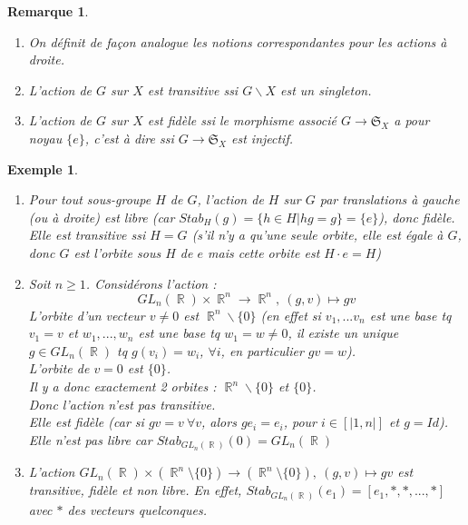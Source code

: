 \documentclass[a4paper, oneside]{report}
\theoremstyle{break}
\newtheorem{exem}[thm]{Exemple}
\newtheorem{remar}[thm]{Remarque}
\newcommand{\x}{\times}
\DeclareMathOperator{\R}{\mathbb{R}}
\renewcommand{\S}{\mathfrak{S}}
\begin{document}
\begin{remar}
	\begin{enumerate}
		\item On définit de façon analogue les notions correspondantes pour les actions à droite.
		\item L'action de $G$ sur $X$ est transitive ssi $G\backslash X$ est un singleton.
		\item L'action de $G$ sur $X$ est fidèle ssi le morphisme associé $G\rightarrow \S_X$ a pour noyau $\{e\}$, c'est à dire ssi $G\rightarrow \S_X$ est injectif.
	\end{enumerate}	
\end{remar}

\begin{exem}
	\begin{enumerate}
		\item Pour tout sous-groupe $H$ de $G$, l'action de $H$ sur $G$ par translations à gauche (ou à droite) est libre (car $Stab_H(g)=\{h\in H |hg=g \}=\{e\}$), donc fidèle.\\
		Elle est transitive ssi $H=G$ (s'il n'y a qu'une seule orbite, elle est égale à $G$, donc $G$ est l'orbite sous $H$ de $e$ mais cette orbite est $H \cdot e=H$)
		\item Soit $n\geq 1$. Considérons l'action :
		$$GL_n(\R)\x \R^n \rightarrow \R^n,~(g,v)\mapsto gv $$
		L'orbite d'un vecteur $v\neq 0$ est $\R^n\backslash \{0\}$ (en effet si $v_1,...v_n$ est une base tq $v_1 = v$ et $w_1,...,w_n$ est une base tq $w_1=w\neq 0$, il existe un unique $g\in GL_n(\R)$ tq $g(v_i)=w_i$, $\forall i$, en particulier $gv=w$).\\
		L'orbite de $v=0$ est $\{0\}$.\\
		Il y a donc exactement 2 orbites : $\R^n\backslash \{0\}$ et $\{0\}$.\\
		Donc l'action n'est pas transitive.\\
		Elle est fidèle (car si $gv=v~\forall v$, alors $ge_i=e_i$, pour $i\in [|1,n|]$ et $g=Id$).\\
		Elle n'est pas libre car $Stab_{GL_n(\R)}(0)=GL_n(\R)$
		
		\item L'action $GL_n(\R)\x (\R^n\setminus\{0\}) \rightarrow 
		(\R^n\setminus\{0\}),~(g,v)\mapsto gv $ est transitive, fidèle et non libre. En effet, $Stab_{GL_n(\R)}(e_1)=[e_1,*,*,...,*]$ avec $*$ des vecteurs quelconques.
		

\end{enumerate}
\end{exem}
\end{document}

